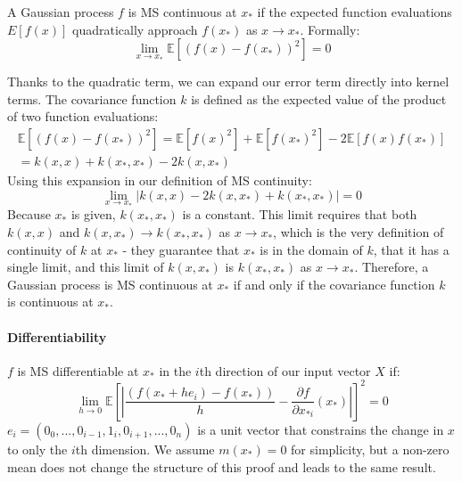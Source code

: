 A Gaussian process $f$ is MS continuous at $x_*$ if the expected function evaluations $E[f(x)]$ quadratically approach $f(x_*)$ as $x \to x_*$. Formally:
\begin{equation*}
    \lim_{x \to x_*} \mathbb{E}[(f(x) - f(x_*))^2] = 0
\end{equation*}

Thanks to the quadratic term, we can expand our error term directly into kernel terms. The covariance function $k$ is defined as the expected value of the product of two function evaluations:
\begin{equation*}
    \begin{aligned}
        \mathbb{E}[(f(x) - f(x_*))^2] = \mathbb{E}[f(x)^2] + \mathbb{E}[f(x_*)^2] - 2\mathbb{E}[f(x)f(x_*)] \\
        = k(x, x) + k(x_*, x_*) - 2k(x, x_*)
    \end{aligned}
\end{equation*}
Using this expansion in our definition of MS continuity: 
\begin{equation} \label{eq:ms_continuity}
    \lim_{x \to x_*} | k(x, x) - 2k(x, x_*) + k(x_*, x_*) | = 0
\end{equation}
Because $x_*$ is given, $k(x_*, x_*)$ is a constant. This limit requires that both $k(x, x)$ and $k(x, x_*) \to k(x_*, x_*)$ as $x \to x_*$, which is the very definition of continuity of $k$ at $x_*$ - they guarantee that $x_*$ is in the domain of $k$, that it has a single limit, and this limit of $k(x, x_*)$ is $k(x_*, x_*)$ as $x \to x_*$. Therefore, a Gaussian process is MS continuous at $x_*$ if and only if the covariance function $k$ is continuous at $x_*$.  

\paragraph{Differentiability}
$f$ is MS differentiable at $x_*$ in the $i$th direction of our input vector $X$ if:
\begin{equation*}
    \lim_{h \to 0} \mathbb{E} \left[| \frac{(f(x_* + h e_i) - f(x_*))}{h} - \frac{\partial f}{\partial x_{*i}}(x_*) |\right]^2 = 0
\end{equation*}
$e_i = (0_0, ..., 0_{i-1}, 1_i, 0_{i+1}, ..., 0_n)$ is a unit vector that constrains the change in $x$ to only the $i$th dimension. We assume $m(x_*) = 0$ for simplicity, but a non-zero mean does not change the structure of this proof and leads to the same result.

